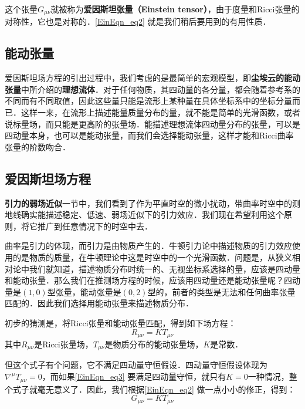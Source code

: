 这个张量$G_{\mu\nu}$就被称为\textbf{爱因斯坦张量（Einstein tensor）}，由于度量和Ricci张量的对称性，它也是对称的．\autoref{EinEqn_eq2} 就是我们稍后要用到的有用性质．



\subsection{能动张量}

爱因斯坦场方程的引出过程中，我们考虑的是最简单的宏观模型，即\textbf{尘埃云的能动张量}中所介绍的\textbf{理想流体}．对于任何物质，其四动量的各分量，都会随着参考系的不同而有不同取值，因此这些量只能是流形上某种量在具体坐标系中的坐标分量而已．这样一来，在流形上描述能量质量分布的量，就不能是简单的光滑函数，或者说标量场，而只能是更高阶的张量场．能描述理想流体四动量分布的张量，可以是四动量本身，也可以是能动张量，而我们会选择能动张量，这样才能和Ricci曲率张量的阶数吻合．





\subsection{爱因斯坦场方程}

\textbf{引力的弱场近似}一节中，我们看到了作为平直时空的微小扰动，带曲率时空中的测地线确实能描述稳定、低速、弱场近似下的引力效应．我们现在希望利用这个原则，将它推广到任意情况下的时空中去．

曲率是引力的体现，而引力是由物质产生的．牛顿引力论中描述物质的引力效应使用的是物质的质量，在牛顿理论中这是时空中的一个光滑函数．问题是，从狭义相对论中我们就知道，描述物质分布时统一的、无视坐标系选择的量，应该是四动量和能动张量．那么我们在推测场方程的时候，应该用四动量还是能动张量呢？四动量是$(1, 0)$型张量，能动张量是$(0, 2)$型的，前者的类型是无法和任何曲率张量匹配的．因此我们选择用能动张量来描述物质分布．

初步的猜测是，将Ricci张量和能动张量匹配，得到如下场方程：
\begin{equation}\label{EinEqn_eq3}
R_{\mu\nu}=KT_{\mu\nu}
\end{equation}
其中$R_{\mu\nu}$是Ricci张量场，$T_{\mu\nu}$是物质分布的能动张量场，$K$是常数．

但这个式子有个问题，它不满足四动量守恒假设．四动量守恒假设体现为$\nabla^\mu T_{\mu\nu}=0$，而如果\autoref{EinEqn_eq3} 要满足四动量守恒，就只有$K=0$一种情况，整个式子就毫无意义了．因此，我们根据\autoref{EinEqn_eq2} 做一点小小的修正，得到：
\begin{equation}
G_{\mu\nu}=KT_{\mu\nu}
\end{equation}

